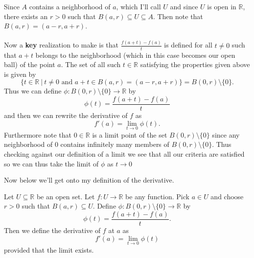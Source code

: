 	Since $A$ contains a neighborhood of $a$, which I'll call $U$ and since $U$ is open in $\mathbb{R}$, there exists an $r > 0$ such that $B(a, r) \subseteq U \subseteq A$.  Then note that $B(a, r) = (a-r, a+r)$. \\ \\ Now a \textbf{key} realization to make is that $\frac{f(a+t) - f(a)}{t}$ is defined for all $t \neq 0$ such that $a + t$ belongs to the neighborhood (which in this case becomes our open ball) of the point $a$. 
	The set of all such $t \in \mathbb{R}$ satisfying the properties given above is given by $$\{t \in \mathbb{R} \ | \  t\neq 0 \text{ and } a+t \in B(a, r) = (a-r, a+r)\} = B(0, r) \setminus \{0\}.$$ Thus we can define $\phi : B(0, r) \setminus \{0\} \to \mathbb{R}$ by $$\phi(t) = \frac{f(a+t) - f(a)}{t}$$ and then we can rewrite the derivative of $f$ as $$f'(a) = \lim_{t \to 0} \phi(t).$$ Furthermore note that $0 \in \mathbb{R}$ is a limit point of the set $B(0, r) \setminus \{0\}$ since any neighborhood of $0$ contains infinitely many members of $B(0, r) \setminus \{0\}$. Thus checking against our definition of a limit we see that all our criteria are satisfied so we can thus take the limit of $\phi$ as $t \to 0$\\
	
	


	Now below we'll get onto my definition of the derivative.
	
	\begin{definition}
		Let $U \subseteq \mathbb{R}$ be an open set. Let $f : U \to \mathbb{R}$ be any function. Pick $a \in U$ and choose $r > 0$ such that $B(a, r) \subseteq U$. Define $\phi : B(0, r) \setminus \{0\} \to \mathbb{R}$ by $$\phi(t) = \frac{f(a+t) - f(a)}{t}.$$ Then we define the derivative of $f$ at $a$ as $$f'(a) = \lim_{t \to 0} \phi(t)$$ provided that the limit exists.
	\end{definition}
	
